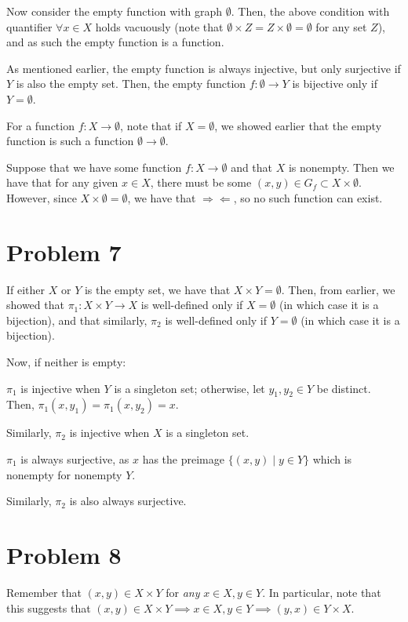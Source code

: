 \documentclass[12pt,letterpaper]{article}
\theoremstyle{definition}
\newcommand{\contra}{\Rightarrow\!\Leftarrow}
\begin{document}
{Now consider the empty function with graph $\emptyset$. Then, the above
condition with quantifier $\forall x \in X$ holds vacuously (note that
$\emptyset \times Z = Z \times \emptyset = \emptyset$ for any set $Z$), and as
such the empty function is a function.

As mentioned earlier, the empty function is always injective, but only
surjective if $Y$ is also the empty set. Then, the empty function $f: \emptyset
\rightarrow Y$ is bijective only if $Y = \emptyset$.

For a function $f: X \rightarrow \emptyset$, note that if $X = \emptyset$, we
showed earlier that the empty function is such a function $\emptyset \rightarrow
\emptyset$.

Suppose that we have some function $f: X \rightarrow \emptyset$ and that $X$ is
nonempty. Then we have that for any given $x \in X$, there must be
some $(x,y) \in G_f \subset X \times \emptyset$. However, since $X \times \emptyset = \emptyset$, we have
that $\contra$, so no such function can exist.

\section*{Problem 7}

If either $X$ or $Y$ is the empty set, we have that $X \times Y = \emptyset$.
Then, from earlier, we showed that $\pi_1: X \times Y \rightarrow X$ is
well-defined only if $X = \emptyset$ (in which case it is a bijection), and that similarly, $\pi_2$ is
well-defined only if $Y = \emptyset$ (in which case it is a bijection).

Now, if neither is empty:

$\pi_1$ is injective when $Y$ is a singleton set; otherwise, let $y_1, y_2 \in
Y$ be distinct. Then, $\pi_1(x,y_1) = \pi_1(x,y_2) = x$.

Similarly, $\pi_2$ is injective when $X$ is a singleton set.

$\pi_1$ is always surjective, as $x$ has the preimage $\{(x,y) \mid y \in Y\}$
which is nonempty for nonempty $Y$.

Similarly, $\pi_2$ is also always surjective.


\section*{Problem 8}

Remember that $(x,y) \in X \times Y$ for \textit{any} $x \in X, y \in Y$. In
particular, note that this suggests that $(x,y) \in X \times Y \implies x \in X,
y \in Y \implies (y,x) \in Y \times X$.

}
\end{document}
